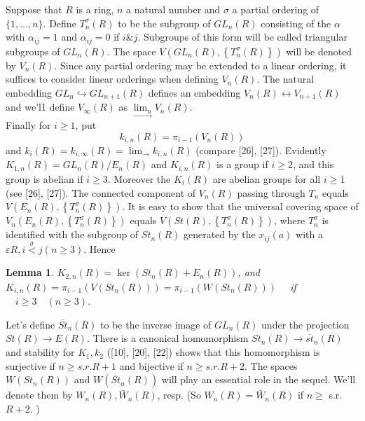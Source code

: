 \documentclass{book}
\newtheorem{lemm}{Lemma}
\begin{document}
Suppose that $R$ is a ring, $n$ a natural number and $\sigma$ a partial ordering of $\{1, \ldots, n\}$. Define $T_n^\sigma(R)$ to be the subgroup of $G L_n(R)$ consisting of the $\alpha$ with $\alpha_{i j}=1$ and $\alpha_{i j}=0$ if $i \& j$. Subgroups of this form will be called triangular subgroups of $G L_n(R)$. The space $V\left(G L_n(R),\left\{T_n^\sigma(R)\right\}\right)$ will be denoted by $V_n(R)$. Since any partial ordering may be extended to a linear ordering, it suffices to consider linear orderings when defining $V_n(R)$. The natural embedding $G L_n \hookrightarrow G L_{n+1}(R)$ defines an embedding $V_n(R) \longleftrightarrow V_{n+1}(R)$ and we'l1 define $V_{\infty}(R)$ as $\underset{\rightarrow}{\lim _n} V_n(R)$. \\
Finally for $i \geq 1$, put $$k_{i, n}(R)=\pi_{i-1}\left(V_n(R)\right)$$ and $k_i(R)=k_{i, \infty}(R)=\lim _{\rightarrow} k_{i, n}(R)$ (compare [26], [27]). Evidently $K_{1, n}(R)=G L_n(R) / E_n(R)$ and $K_{i, n}(R)$ is a group if $i \geq 2$, and this group is abelian if $i \geq 3$. Moreover the $K_i(R)$ are abelian groups for all $i \geq 1$ (see [26], [27]). The connected component of $V_n(R)$ passing through $T_n$ equals $V\left(E_n(R),\left\{T_n^\sigma(R)\right\}\right)$. It is easy to show that the universal covering space of $V_n\left(E_n(R),\left\{T_n^\sigma(R)\right\}\right)$ equals $V\left(S t(R),\left\{T_n^\sigma(R)\right\}\right)$, where $T_n^\sigma$ is identified with the subgroup of $S t_n(R)$ generated by the $x_{i j}(a)$ with a $\varepsilon R, i \stackrel{\sigma}{<} j(n \geq 3)$. Hence

\begin{lemm}
    $K_{2, n}(R)=\operatorname{ker}\left(S t_n(R)+E_n(R)\right)$, and $K_{i, n}(R)=\pi_{i-1}\left(V\left(S t_n(R)\right)\right)=\pi_{i-1}\left(W\left(S t_n(R)\right)\right) \quad$ if $\quad i \geq 3 \quad(n \geq 3)$.
\end{lemm}    

Let's define $\overline{S t}_n(R)$ to be the inverse image of $G L_n(R)$ under the projection $S t(R) \rightarrow E(R)$. There is a canonical homomorphism $S t_n(R) \rightarrow \overline{s t}_n(R)$ and stability for $K_1, k_2$ ([10], [20], [22]) shows that this homomorphism is surjective if $n \geq s . r . R+1$ and bijective if $n \geq s . r . R+2$. The spaces $W\left(S t_n(R)\right)$ and $W\left(\overline{S t}_n(R)\right)$ will play an essential role in the sequel. We'll denote them by $W_n(R), \bar{W}_n(R)$, resp. (So $W_n(R)=\bar{W}_n(R)$ if $n \geq$ s.r. $R+2$. )
\end{document}
